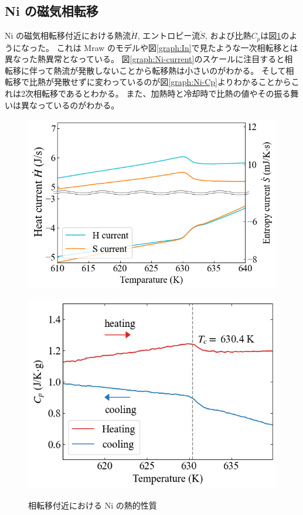 \documentclass[9pt,dvipdfmx,a4paper]{jsarticle}
\begin{document}
\subsection{Ni の磁気相転移}
Ni の磁気相転移付近における熱流\(\dot{H}\), エントロピー流\(\dot{S}\), および比熱\(C_p\)は図\ref{graph:Ni}のようになった。
これは Mraw のモデルや図\ref{graph:In}で見たような一次相転移とは異なった熱異常となっている。
図\ref{graph:Ni-current}のスケールに注目すると相転移に伴って熱流が発散しないことから転移熱は小さいのがわかる。
そして相転移で比熱が発散せずに変わっているのが図\ref{graph:Ni-Cp}よりわかることからこれは2次相転移であるとわかる。
また、加熱時と冷却時で比熱の値やその振る舞いは異なっているのがわかる。
\begin{figure}[hbt]
    \centering
    \begin{minipage}[t]{0.50\columnwidth}
        \centering
        \includegraphics[width = \columnwidth]{result/Ni-current.png}
        \label{graph:Ni-current}
    \end{minipage}
    \hfill
    \begin{minipage}[t]{0.46\columnwidth}
        \centering
        \includegraphics[width = \columnwidth]{result/Ni-Cp.png}
        \label{graph:Ni-Cp}
    \end{minipage}
    \caption{相転移付近における Ni の熱的性質}
    \label{graph:Ni}
\end{figure}
\end{document}
